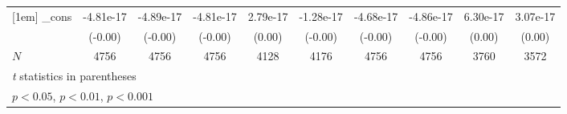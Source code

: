 {\begin{tabular}{l*{9}{c}}
[1em]
\_cons      &   -4.81e-17         &   -4.89e-17         &   -4.81e-17         &    2.79e-17         &   -1.28e-17         &   -4.68e-17         &   -4.86e-17         &    6.30e-17         &    3.07e-17         \\
            &     (-0.00)         &     (-0.00)         &     (-0.00)         &      (0.00)         &     (-0.00)         &     (-0.00)         &     (-0.00)         &      (0.00)         &      (0.00)         \\
\hline
\(N\)       &        4756         &        4756         &        4756         &        4128         &        4176         &        4756         &        4756         &        3760         &        3572         \\
\hline\hline
\multicolumn{10}{l}{\footnotesize \textit{t} statistics in parentheses}\\
\multicolumn{10}{l}{\footnotesize \sym{*} \(p<0.05\), \sym{**} \(p<0.01\), \sym{***} \(p<0.001\)}\\
\end{tabular}
}
